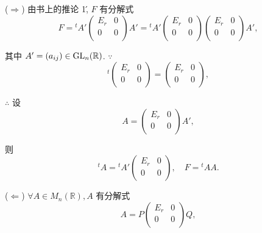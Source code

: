 \documentclass[color=black,device=normal,lang=cn,mode=geye]{elegantnote}
\begin{document}
\begin{solution}
    ($\Rightarrow$) 由书上的推论 1\', $F$ 有分解式
    \[F={}^tA'\begin{pmatrix}
        E_r & 0 \\
        0 & 0 \\
    \end{pmatrix}A'={}^tA'\begin{pmatrix}
        E_r & 0 \\
        0 & 0 \\
    \end{pmatrix}\begin{pmatrix}
        E_r & 0 \\
        0 & 0 \\
    \end{pmatrix}A',\]

    其中 $A'=(a_{ij})\in\operatorname{GL}_n(\mathbb{R})$. $\because$
    \[{}^t\begin{pmatrix}
        E_r & 0 \\
        0 & 0 \\
    \end{pmatrix}=\begin{pmatrix}
        E_r & 0 \\
        0 & 0 \\
    \end{pmatrix},\]

    $\therefore$ 设
    \[A=\begin{pmatrix}
        E_r & 0 \\
        0 & 0 \\
    \end{pmatrix}A',\]

    则
    \[{}^tA={}^tA'\begin{pmatrix}
        E_r & 0 \\
        0 & 0 \\
    \end{pmatrix},\quad F={}^tAA.\]

    ($\Leftarrow$) $\forall A\in M_n(\mathbb{R}),A$ 有分解式
    \[A=P\begin{pmatrix}
        E_r & 0 \\
        0 & 0 \\
    \end{pmatrix}Q,\]


\end{solution}
\end{document}
